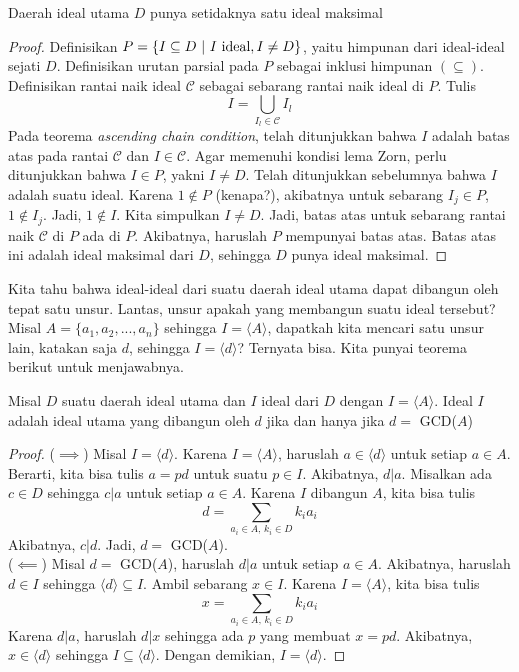	\begin{theorem}
		Daerah ideal utama $D$ punya setidaknya satu ideal maksimal
	\end{theorem}

	\begin{proof}
		Definisikan $P = \{ I \subseteq D \ | \ I \ \textnormal{ideal}, I \ne D  \}$, yaitu himpunan dari ideal-ideal sejati $D$. Definisikan urutan parsial pada $P$ sebagai inklusi himpunan $(\subseteq)$. Definisikan rantai naik ideal $\mathcal{C}$ sebagai sebarang rantai naik ideal di $P$. Tulis $$I = \bigcup_{I_l \in \mathcal{C}} I_l$$
		Pada teorema \textit{ascending chain condition}, telah ditunjukkan bahwa $I$ adalah batas atas pada rantai $\mathcal{C}$ dan $I \in \mathcal{C}$. Agar memenuhi kondisi lema Zorn, perlu ditunjukkan bahwa $I \in P$, yakni $I \ne D$. Telah ditunjukkan sebelumnya bahwa $I$ adalah suatu ideal. Karena $1 \not\in P$ (kenapa?), akibatnya untuk sebarang $I_j \in P$, $1 \not\in I_j$. Jadi, $1 \not\in I$. Kita simpulkan $I \ne D$. Jadi, batas atas untuk sebarang rantai naik $\mathcal{C}$ di $P$ ada di $P$. Akibatnya, haruslah $P$ mempunyai batas atas. Batas atas ini adalah ideal maksimal dari $D$, sehingga $D$ punya ideal maksimal.
	\end{proof}
	Kita tahu bahwa ideal-ideal dari suatu daerah ideal utama dapat dibangun oleh tepat satu unsur. Lantas, unsur apakah yang membangun suatu ideal tersebut? Misal $A = \{ a_1, a_2, ..., a_n \}$ sehingga $I = \langle A \rangle$, dapatkah kita mencari satu unsur lain, katakan saja $d$, sehingga $I = \langle d \rangle$? Ternyata bisa. Kita punyai teorema berikut untuk menjawabnya.
	\begin{theorem}
		\label{generatorIU}
		Misal $D$ suatu daerah ideal utama dan $I$ ideal dari $D$ dengan $I = \langle A \rangle$. Ideal $I$ adalah ideal utama yang dibangun oleh $d$ jika dan hanya jika $d = $ GCD($A$)
	\end{theorem}
	\begin{proof}
		($\implies$) Misal $I = \langle d \rangle$. Karena $I = \langle A \rangle$, haruslah $a \in \langle d \rangle$ untuk setiap $a \in A$. Berarti, kita bisa tulis $a = pd$ untuk suatu $p \in I$. Akibatnya, $d | a$. Misalkan ada $c \in D$ sehingga $c|a$ untuk setiap $a \in A$. Karena $I$ dibangun $A$, kita bisa tulis $$d = \sum_{a_i \in A,\, k_i \in D} k_i a_i$$Akibatnya, $c | d$. Jadi, $d = $ GCD($A$).
		\\
		
		($\impliedby$) Misal $d = $ GCD($A$), haruslah $d | a$ untuk setiap $a \in A$. Akibatnya, haruslah $d \in I$ sehingga $\langle d \rangle \subseteq I$. Ambil sebarang $x \in I$. Karena $I = \langle A \rangle$, kita bisa tulis $$x = \sum_{a_i \in A, \, k_i \in D} k_i a_i$$Karena $d | a$, haruslah $d | x$ sehingga ada $p$ yang membuat $x = pd$. Akibatnya, $x \in \langle d \rangle$ sehingga $I \subseteq \langle d \rangle$. Dengan demikian, $I = \langle d \rangle$.
	\end{proof}
